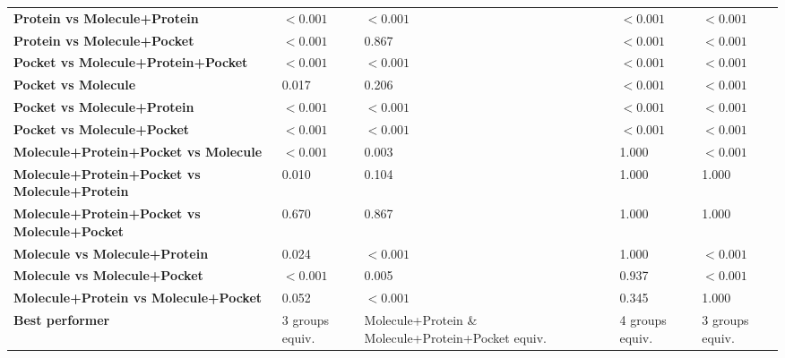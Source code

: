 \begin{table}[H]
{\begin{tabular}{lllll}
        \textbf{Protein vs Molecule+Protein} & $< 0.001$ & $< 0.001$ & $< 0.001$ & $< 0.001$ \\
        \textbf{Protein vs Molecule+Pocket} & $< 0.001$ & 0.867 & $< 0.001$ & $< 0.001$ \\
        \textbf{Pocket vs Molecule+Protein+Pocket} & $< 0.001$ & $< 0.001$ & $< 0.001$ & $< 0.001$ \\
        \textbf{Pocket vs Molecule} & 0.017 & 0.206 & $< 0.001$ & $< 0.001$ \\
        \textbf{Pocket vs Molecule+Protein} & $< 0.001$ & $< 0.001$ & $< 0.001$ & $< 0.001$ \\
        \textbf{Pocket vs Molecule+Pocket} & $< 0.001$ & $< 0.001$ & $< 0.001$ & $< 0.001$ \\
        \textbf{Molecule+Protein+Pocket vs Molecule} & $< 0.001$ & 0.003 & 1.000 & $< 0.001$ \\
        \textbf{Molecule+Protein+Pocket vs Molecule+Protein} & 0.010 & 0.104 & 1.000 & 1.000 \\
        \textbf{Molecule+Protein+Pocket vs Molecule+Pocket} & 0.670 & 0.867 & 1.000 & 1.000 \\
        \textbf{Molecule vs Molecule+Protein} & 0.024 & $< 0.001$ & 1.000 & $< 0.001$ \\
        \textbf{Molecule vs Molecule+Pocket} & $< 0.001$ & 0.005 & 0.937 & $< 0.001$ \\
        \textbf{Molecule+Protein vs Molecule+Pocket} & 0.052 & $< 0.001$ & 0.345 & 1.000 \\
        \textbf{Best performer} & 3 groups equiv. & Molecule+Protein \& Molecule+Protein+Pocket equiv. & 4 groups equiv. & 3 groups equiv. \\
        \bottomrule
    \end{tabular}}
\end{table}